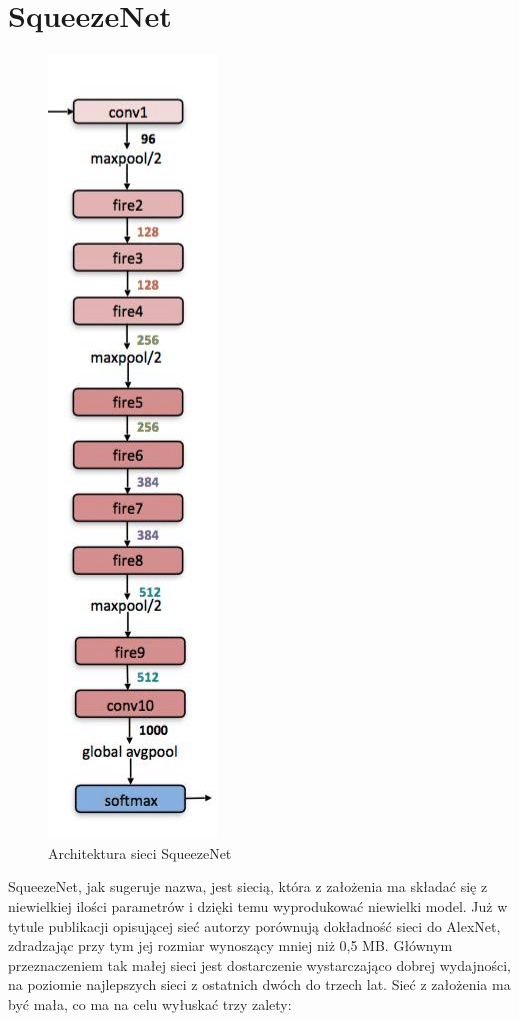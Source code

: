 \documentclass[12pt,a4paper,twoside,titlepage,openright]{book}
\begin{document}
\section{SqueezeNet}
\begin{figure}[ht]
	\centering
			\includegraphics[resolution=100, scale=0.65]{SqueezeNet.png}
		\caption{Architektura sieci SqueezeNet}
\end{figure}
SqueezeNet, jak sugeruje nazwa, jest siecią, która z założenia ma składać się z niewielkiej ilości parametrów i dzięki temu wyprodukować niewielki model. Już w tytule publikacji opisującej sieć autorzy porównują dokładność sieci do AlexNet, zdradzając przy tym jej rozmiar wynoszący mniej niż 0,5 MB. Głównym przeznaczeniem tak małej sieci jest dostarczenie wystarczająco dobrej wydajności, na poziomie najlepszych sieci z ostatnich dwóch do trzech lat. Sieć z założenia ma być mała, co ma na celu wyłuskać trzy zalety:
\end{document}
